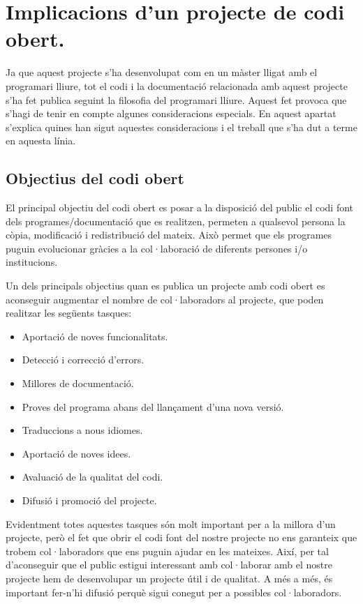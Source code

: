 \chapter{Implicacions d'un projecte de codi obert.}
\label{chap:codi_obert}

Ja que aquest projecte s'ha desenvolupat com en un màster lligat amb el programari lliure, tot el codi i la documentació relacionada amb aquest projecte s'ha fet publica seguint la filosofia del programari lliure. Aquest fet provoca que s'hagi de tenir en compte algunes consideracions especials. En aquest apartat s'explica quines han sigut aquestes consideracions i el treball que s'ha dut a terme en aquesta línia. 

\section{Objectius del codi obert}

El principal objectiu del codi obert es posar a la disposició del public el codi font dels programes/documentació que es realitzen, permeten a qualsevol persona la còpia, modificació i redistribució del mateix. Això permet que els programes puguin evolucionar gràcies a la col·laboració de diferents persones i/o institucions.

Un dels principals objectius quan es publica un projecte amb codi obert es aconseguir augmentar el nombre de col·laboradors al projecte, que poden realitzar les següents tasques:

\begin{itemize}
\item{Aportació de noves funcionalitats.}
\item{Detecció i correcció d'errors.}
\item{Millores de documentació.}
\item{Proves del programa abans del llançament d'una nova versió.}
\item{Traduccions a nous idiomes.}
\item{Aportació de noves idees.}
\item{Avaluació de la qualitat del codi.}
\item{Difusió i promoció del projecte.}
\end{itemize}

Evidentment totes aquestes tasques són molt important per a la millora d'un projecte, però el fet que obrir el codi font del nostre projecte no ens garanteix que trobem col·laboradors que ens puguin ajudar en les mateixes. Així, per tal d'aconseguir que el public estigui interessant amb col·laborar amb el nostre projecte hem de desenvolupar un projecte útil i de qualitat. A més a més, és important fer-n'hi difusió perquè sigui conegut per a possibles col·laboradors.  

